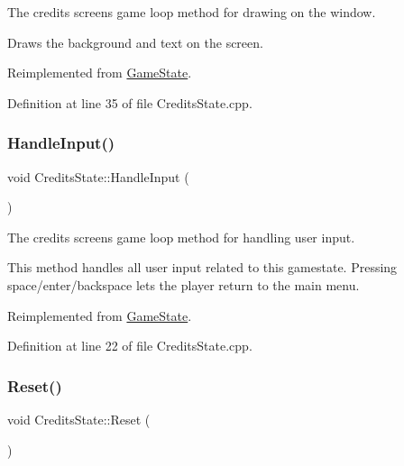 The credits screen\textquotesingle{}s game loop method for drawing on the window. 

Draws the background and text on the screen. 

Reimplemented from \hyperlink{class_game_state_a8741c5c696c6c366beb4b845c08c3cf8}{Game\+State}.



Definition at line 35 of file Credits\+State.\+cpp.

\mbox{\label{class_credits_state_a63557b2290a2febb88e78ae90754a7ec}} 
\subsubsection{\texorpdfstring{Handle\+Input()}{HandleInput()}}
{\footnotesize\ttfamily void Credits\+State\+::\+Handle\+Input (\begin{DoxyParamCaption}{ }\end{DoxyParamCaption})\hspace{0.3cm}{\ttfamily [virtual]}}



The credits screen\textquotesingle{}s game loop method for handling user input. 

This method handles all user input related to this gamestate. Pressing space/enter/backspace lets the player return to the main menu. 

Reimplemented from \hyperlink{class_game_state_a8bce2828cee99ae7c07322804531fd01}{Game\+State}.



Definition at line 22 of file Credits\+State.\+cpp.

\mbox{\label{class_credits_state_ad87636e8b9438092bd0151185f385c17}} 
\subsubsection{\texorpdfstring{Reset()}{Reset()}}
{\footnotesize\ttfamily void Credits\+State\+::\+Reset (\begin{DoxyParamCaption}{ }\end{DoxyParamCaption})\hspace{0.3cm}{\ttfamily [virtual]}}



